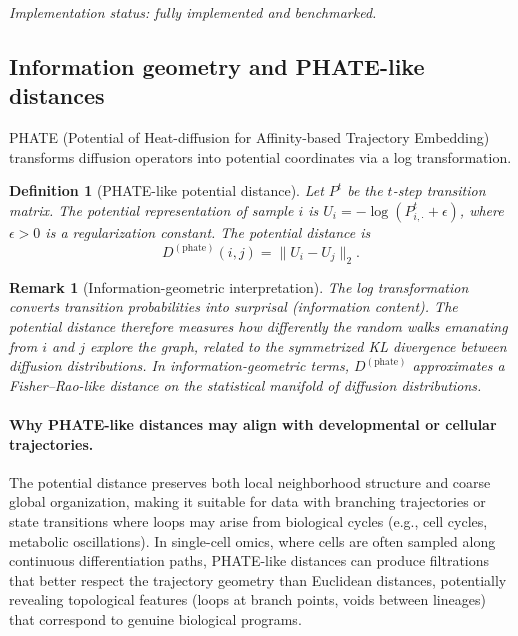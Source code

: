 \documentclass[11pt]{article}
\newtheorem{definition}[theorem]{Definition}
\newtheorem{remark}[theorem]{Remark}
\begin{document}
\emph{Implementation status: fully implemented and benchmarked.}

\subsection{Information geometry and PHATE-like distances}
\label{sec:phate}

PHATE (Potential of Heat-diffusion for Affinity-based Trajectory Embedding) \cite{moon2019phate} transforms diffusion operators into potential coordinates via a log transformation.

\begin{definition}[PHATE-like potential distance]\label{def:phate}
Let $P^t$ be the $t$-step transition matrix.
The \emph{potential representation} of sample $i$ is $U_i = -\log(P^t_{i,\cdot} + \epsilon)$, where $\epsilon > 0$ is a regularization constant.
The \emph{potential distance} is
\[
D^{(\text{phate})}(i,j) = \|U_i - U_j\|_2.
\]
\end{definition}

\begin{remark}[Information-geometric interpretation]\label{rem:phate_info}
The log transformation converts transition probabilities into surprisal (information content).
The potential distance therefore measures how differently the random walks emanating from $i$ and $j$ explore the graph, related to the symmetrized KL divergence between diffusion distributions.
In information-geometric terms, $D^{(\text{phate})}$ approximates a Fisher--Rao-like distance on the statistical manifold of diffusion distributions.
\end{remark}

\paragraph{Why PHATE-like distances may align with developmental or cellular trajectories.}
The potential distance preserves both local neighborhood structure and coarse global organization, making it suitable for data with branching trajectories or state transitions where loops may arise from biological cycles (e.g., cell cycles, metabolic oscillations).
In single-cell omics, where cells are often sampled along continuous differentiation paths, PHATE-like distances can produce filtrations that better respect the trajectory geometry than Euclidean distances, potentially revealing topological features (loops at branch points, voids between lineages) that correspond to genuine biological programs.
\end{document}
